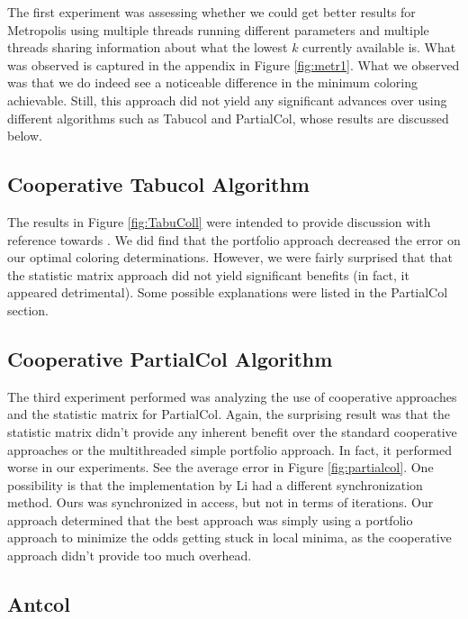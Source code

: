 \documentclass[runningheads]{llncs}
\begin{document}
The first experiment was assessing whether we could get better results for Metropolis using multiple threads running different parameters and multiple threads sharing information about what the lowest $k$ currently available is. What was observed is captured in the appendix in Figure \ref{fig:metr1}. What we observed was that we do indeed see a noticeable difference in the minimum coloring achievable. Still, this approach did not yield any significant advances over using different algorithms such as Tabucol and PartialCol, whose results are discussed below. 

\subsection{Cooperative Tabucol Algorithm}

The results in Figure \ref{fig:TabuColl} were intended to provide discussion with reference towards \cite{https://doi.org/10.5445/ir/1000083192}. We did find that the portfolio approach decreased the error on our optimal coloring determinations. However, we were fairly surprised that that the statistic matrix approach did not yield significant benefits (in fact, it appeared detrimental). Some possible explanations were listed in the PartialCol section. 

\subsection{Cooperative PartialCol Algorithm}

The third experiment performed was analyzing the use of cooperative approaches and the statistic matrix for PartialCol. Again, the surprising result was that the statistic matrix didn't provide any inherent benefit over the standard cooperative approaches or the multithreaded simple portfolio approach. In fact, it performed worse in our experiments. See the average error in Figure \ref{fig:partialcol}.
One possibility is that the implementation by Li had a different synchronization method. Ours was synchronized in access, but not in terms of iterations. Our approach determined that the best approach was simply using a portfolio approach to minimize the odds getting stuck in local minima, as the cooperative approach didn't provide too much overhead.

\subsection{Antcol}
\end{document}
